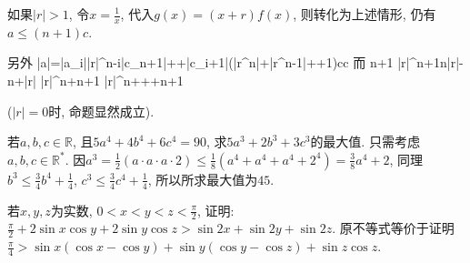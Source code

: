 如果$|r|>1$, 令$x=\frac{1}{x}$, 代入$g(x)=(x+r)f(x)$, 则转化为上述情形, 仍有$a\le(n+1)c$.

另外
\bee
  |a|=|a_i|\le|r|^{n-i}|c_{n+1}|+\cdots+|c_{i+1}|\le(|r^n|+|r^{n-1}|+\cdots+1)c\le{}c
\eee
而
\bee
{}\le n+1
\Longleftrightarrow |r|^{n+1}\ge n|r|-n+|r|
\Longleftrightarrow |r|^n+\ge n+1
\Longleftrightarrow |r|^n++\cdots+\ge n+1
\eee

($|r|=0$时, 命题显然成立).
\ea

\bq{}{}
若$a,b,c\in\mathbb{R}$, 且$5a^4+4b^4+6c^4=90$, 求$5a^3+2b^3+3c^3$的最大值.
\eq
\ba
只需考虑$a,b,c\in\mathbb{R}^*$. 因$a^3=\frac12(a\cdot a\cdot a\cdot2)\le\frac{1}{8}(a^4+a^4+a^4+2^4)=\frac38a^4+2$,
同理$b^3\le\frac34b^4+\frac14$, $c^3\le\frac34c^4+\frac14$, 所以所求最大值为$45$.
\ea

\bq{}{}
若$x,y,z$为实数, $0<x<y<z<\frac{\pi}{2}$, 证明: $\frac{\pi}{2}+2\sin x\cos y+2\sin y\cos z>\sin 2x+\sin 2y+\sin 2z$.
\eq
\ba
原不等式等价于证明$\frac{\pi}{4}>\sin x(\cos x-\cos y)+\sin y(\cos y-\cos z)+\sin z\cos z$.
\ea